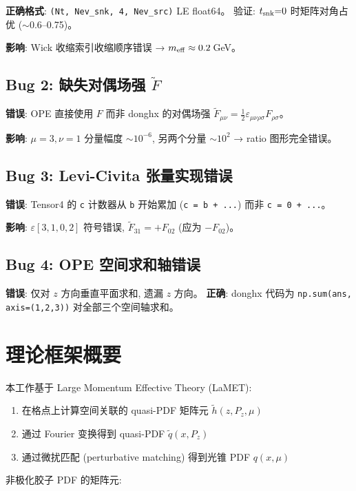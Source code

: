\documentclass[12pt,a4paper]{ctexart}
\begin{document}
\textbf{正确格式}: \texttt{(Nt, Nev\_snk, 4, Nev\_src)} LE float64。
验证: $t_{\rm snk}{=}0$ 时矩阵对角占优 ($\sim$0.6--0.75)。

\textbf{影响}: Wick 收缩索引收缩顺序错误 → $m_{\rm eff} \approx 0.2$\,GeV。

\subsection{Bug 2: 缺失对偶场强 $\widetilde{F}$}
\textbf{错误}: OPE 直接使用 $F$ 而非 donghx 的对偶场强
$\widetilde{F}_{\mu\nu} = \tfrac12\varepsilon_{\mu\nu\rho\sigma}F_{\rho\sigma}$。

\textbf{影响}: $\mu{=}3,\nu{=}1$ 分量幅度 $\sim 10^{-6}$, 另两个分量 $\sim 10^2$ → ratio 图形完全错误。

\subsection{Bug 3: Levi-Civita 张量实现错误}
\textbf{错误}: Tensor4 的 \texttt{c} 计数器从 \texttt{b} 开始累加
(\texttt{c = b + ...}) 而非 \texttt{c = 0 + ...}。

\textbf{影响}: $\varepsilon[3,1,0,2]$ 符号错误,
$\widetilde{F}_{31} = +F_{02}$ (应为 $-F_{02}$)。

\subsection{Bug 4: OPE 空间求和轴错误}
\textbf{错误}: 仅对 $z$ 方向垂直平面求和, 遗漏 $z$ 方向。
\textbf{正确}: donghx 代码为 \texttt{np.sum(ans, axis=(1,2,3))} 对全部三个空间轴求和。

\section{理论框架概要}

本工作基于 Large Momentum Effective Theory (LaMET):

\begin{enumerate}[leftmargin=*]
  \item 在格点上计算空间关联的 quasi-PDF 矩阵元 $\tilde{h}(z, P_z, \mu)$
  \item 通过 Fourier 变换得到 quasi-PDF $\tilde{q}(x, P_z)$
  \item 通过微扰匹配 (perturbative matching) 得到光锥 PDF $q(x, \mu)$
\end{enumerate}

非极化胶子 PDF 的矩阵元:
\end{document}
